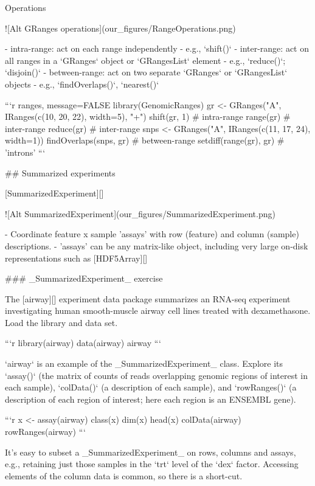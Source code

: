 Operations

  ![Alt GRanges operations](our_figures/RangeOperations.png)

- intra-range: act on each range independently
    - e.g., `shift()`
- inter-range: act on all ranges in a `GRanges` object or
  `GRangesList` element
      - e.g., `reduce()`; `disjoin()`
- between-range: act on two separate `GRanges` or `GRangesList`
  objects
      - e.g., `findOverlaps()`, `nearest()`

```{r ranges, message=FALSE}
library(GenomicRanges)
gr <- GRanges("A", IRanges(c(10, 20, 22), width=5), "+")
shift(gr, 1)                            # intra-range
range(gr)                               # inter-range
reduce(gr)                              # inter-range
snps <- GRanges("A", IRanges(c(11, 17, 24), width=1))
findOverlaps(snps, gr)                  # between-range
setdiff(range(gr), gr)                  # 'introns'
```

## Summarized experiments

[SummarizedExperiment][]

![Alt SummarizedExperiment](our_figures/SummarizedExperiment.png)

- Coordinate feature x sample 'assays' with row (feature) and column
  (sample) descriptions.
- 'assays' can be any matrix-like object, including very large on-disk
  representations such as [HDF5Array][]

### _SummarizedExperiment_ exercise

The [airway][] experiment data package summarizes an RNA-seq
experiment investigating human smooth-muscle airway cell lines treated
with dexamethasone. Load the library and data set.

```{r}
library(airway)
data(airway)
airway
```

`airway` is an example of the _SummarizedExperiment_ class. Explore
its `assay()` (the matrix of counts of reads overlapping genomic
regions of interest in each sample), `colData()` (a description of
each sample), and `rowRanges()` (a description of each region of
interest; here each region is an ENSEMBL gene).

```{r}
x <- assay(airway)
class(x)
dim(x)
head(x)
colData(airway)
rowRanges(airway)
```

It's easy to subset a _SummarizedExperiment_ on rows, columns and
assays, e.g., retaining just those samples in the `trt` level of the
`dex` factor. Accessing elements of the column data is common, so
there is a short-cut.

